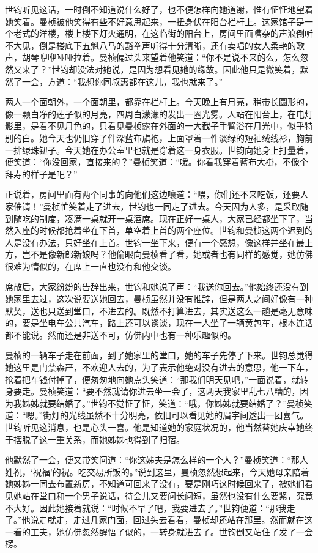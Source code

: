 \par 世钧听见这话，一时倒不知道说什么好了，也不便怎样向她道谢，惟有怔怔地望着她笑着。曼桢被他笑得有些不好意思起来，一扭身伏在阳台栏杆上。这家馆子是一个老式的洋楼，楼上楼下灯火通明，在这临街的阳台上，房间里面嘈杂的声浪倒听不大见，倒是楼底下五魁八马的豁拳声听得十分清晰，还有卖唱的女人柔艳的歌声，胡琴咿咿哑哑拉着。曼桢偏过头来望着他笑道：“你不是说不来的么，怎么忽然又来了？”世钧却没法对她说，是因为想看见她的缘故。因此他只是微笑着，默然了一会，方道：“我想你同叔惠都在这儿，我也就来了。”
\par 两人一个面朝外，一个面朝里，都靠在栏杆上。今天晚上有月亮，稍带长圆形的，像一颗白净的莲子似的月亮，四周白濛濛的发出一圈光雾。人站在阳台上，在电灯影里，是看不见月色的，只看见曼桢露在外面的一大截子手臂浴在月光中，似乎特别的白。她今天也仍旧穿了件深蓝布旗袍，上面罩着一件淡绿的短袖绒线衫，胸前一排绿珠钮子。今天她在办公室里也就是穿着这一身衣服。世钧向她身上打量着，便笑道：“你没回家，直接来的？”曼桢笑道：“嗳。你看我穿着蓝布大褂，不像个拜寿的样子是吧？”
\par 正说着，房间里面有两个同事的向他们这边嚷道：“喂，你们还不来吃饭，还要人家催请！”曼桢忙笑着走了进去，世钧也一同走了进去。今天因为人多，是采取随到随吃的制度，凑满一桌就开一桌酒席。现在正好一桌人，大家已经都坐下了，当然入座的时候都抢着坐在下首，单空着上首的两个座位。世钧和曼桢这两个迟到的人是没有办法，只好坐在上首。世钧一坐下来，便有一个感想，像这样并坐在最上方，岂不是像新郎新娘吗？他偷眼向曼桢看了看，她或者也有同样的感觉，她仿佛很难为情似的，在席上一直也没有和他交谈。
\par 席散后，大家纷纷的告辞出来，世钧和她说了声：“我送你回去。”他始终还没有到她家里去过，这次说要送她回去，曼桢虽然并没有推辞，但是两人之间好像有一种默契，送也只送到堂口，不进去的。既然不打算进去，其实送这么一趟是毫无意味的，要是坐电车公共汽车，路上还可以谈谈，现在一人坐了一辆黄包车，根本连话都不能说。然而还是非送不可，仿佛内中也有一种乐趣似的。
\par 曼桢的一辆车子走在前面，到了她家里的堂口，她的车子先停了下来。世钧总觉得她这里是门禁森严，不欢迎人去的，为了表示他绝对没有进去的意思，他一下车，抢着把车钱付掉了，便匆匆地向她点头笑道：“那我们明天见吧，”一面说着，就转身要走。曼桢笑道：“要不然就请你进去坐一会了，这两天我家里乱七八糟的，因为我姊姊就要结婚了。”世钧不觉怔了怔，笑道：“哦，你姊姊就要结婚了？”曼桢笑道：“嗯。”街灯的光线虽然不十分明亮，依旧可以看见她的眉宇间透出一团喜气。世钧听见这消息，也是心头一喜。他是知道她的家庭状况的，他当然替她庆幸她终于摆脱了这一重关系，而她姊姊也得到了归宿。
\par 他默然了一会，便又带笑问道：“你这姊夫是怎么样的一个人？”曼桢笑道：“那人姓祝，‘祝福’的祝。吃交易所饭的。”说到这里，曼桢忽然想起来，今天她母亲陪着她姊姊一同去布置新房，不知道可回来了没有，要是刚巧这时候回来了，被她们看见她站在堂口和一个男子说话，待会儿又要问长问短，虽然也没有什么要紧，究竟不大好。因此她接着就说：“时候不早了吧，我要进去了。”世钧便道：“那我走了。”他说走就走，走过几家门面，回过头去看看，曼桢却还站在那里。然而就在这一看的工夫，她仿佛忽然醒悟了似的，一转身就进去了。世钧倒又站住了发了一会楞。
